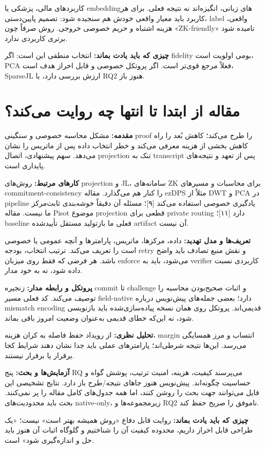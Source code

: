 \documentclass[11pt,a4paper]{article}
\newcommand{\lesson}[1]{\clearpage\section{#1}}
\newcommand{\takeaway}[1]{\par\textbf{چیزی که باید یادت بماند:} #1\par}
\begin{document}
کاربردهای مالی، پزشکی یا embeddingهای زبانی، انگیزه‌اند نه نتیجه فعلی. برای هر کاربرد باید معیار واقعی خودش هم سنجیده شود: تصمیم پایین‌دستی، label واقعی، هزینه اشتباه و حریم خصوصی خروجی. روش صرفاً چون «ZK-friendly» نامیده شود برتری کاربردی ندارد.

\takeaway{انتخاب منطقی این است: اگر fidelity بومی اولویت است، PCA فعلاً مرجع قوی‌تر است. اگر پروتکل خصوصی و قابل احراز هدف است، SparseJL ارزش بررسی دارد، با RQ2 هنوز باز.}

\lesson{مقاله از ابتدا تا انتها چه روایت می‌کند؟}
\textbf{مقدمه:} مشکل محاسبه خصوصی و سنگینی proof را طرح می‌کند؛ کاهش بُعد را راه کاهش بخشی از هزینه معرفی می‌کند و خطر انتخاب داده پس از ماتریس را نشان می‌دهد. سهم پیشنهادی، اتصال projection تنک به transcript پس از تعهد و نتیجه‌های پایداری است.

\textbf{کارهای مرتبط:} روش‌های projection و JL، سامانه‌های ZK برای محاسبات و مسیرهای commitment-consistency را کنار هم می‌گذارد. مقاله ezDPS مثلاً از DWT و PCA در pipeline یادگیری خصوصی استفاده می‌کند [۹]؛ مسئله آن دقیقاً خوشه‌بندی ثابت‌مرکز ما نیست. مقاله Pisot موضوع projection قطعی برای private routing دارد [۱۱]؛ baseline فعلی ما بازتولید مستقل تأییدشده artifact آن نیست.

\textbf{تعریف‌ها و مدل تهدید:} داده، مرکزها، ماتریس، پارامترها و آنچه عمومی یا خصوصی است را تعریف می‌کند. ترتیب انتخاب، بودجه retry و نقش منبع تصادف باید واضح باشد. هر فرضی که فقط روی میزبان enforce می‌شود، باید به verifier کاربردی نسبت داده شود، نه به خود مدار.

\textbf{پروتکل و رابطه مدار:} زنجیره commit تا challenge و اثبات صحیح‌بودن محاسبه را توصیف می‌کند. کد فعلی مسیر field-native دارد؛ بعضی جمله‌های پیش‌نویس درباره mismatch encoding قدیمی‌اند. پروتکل روی همان نسخه پیاده‌سازی‌شده باید بازنویسی شود، نه این‌که خطای قدیمی به‌عنوان وضعیت امروز باقی بماند.

\textbf{تحلیل نظری:} از رویداد حفظ فاصله به کران هزینه، margin انتساب و مرز همسایگی می‌رسد. این‌ها نتیجه شرطی‌اند؛ پارامترهای عملی باید جدا نشان دهند شرایط کجا برقرار یا برقرار نیستند.

\textbf{آزمایش‌ها و بحث:} پنج RQ می‌پرسند کیفیت، هزینه، امنیت ترتیب، پوشش گواه و حساسیت چگونه‌اند. پیش‌نویس هنوز جاهای نتیجه/طرح باز دارد. نتایج تشخیصی این فایل می‌توانند جهت بحث را روشن کنند، اما همه جدول‌های کامل مقاله را پر نمی‌کنند. بحث باید محدودیت‌های native-only، زیرمجموعه‌ها و RQ2 ناموفق را صریح حفظ کند.

\takeaway{روایت قابل دفاع «روش همیشه بهتر است» نیست؛ «یک طراحی قابل احراز داریم، محدوده کیفیت آن را شناختیم و گلوگاه اثبات آن هنوز باید حل و اندازه‌گیری شود» است.}
\end{document}
